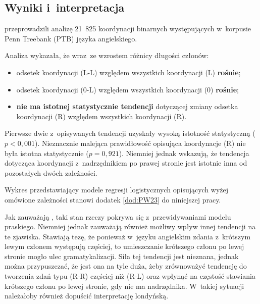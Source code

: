 





\subsection{Wyniki i~interpretacja}

\cite{przepiorkowski2023conjunct} przeprowadzili analizę 21~825 koordynacji binarnych występujących w~korpusie Penn Treebank (PTB) języka angielskiego.

Analiza wykazała, że wraz~ze wzrostem różnicy długości członów:
\begin{itemize}
\item odsetek koordynacji (L-L) względem wszystkich koordynacji (L) \textbf{rośnie};
\item odsetek koordynacji (0-L) względem wszystkich koordynacji (0) \textbf{rośnie};
\item \textbf{nie ma istotnej statystycznie tendencji} dotyczącej zmiany odsetka koordynacji (R) względem wszystkich koordynacji (R).
\end{itemize}

Pierwsze dwie z~opisywanych tendencji uzyskały wysoką istotność statystyczną ($p<0,001$). Nieznacznie malejąca prawidłowość opisująca koordynacje (R) nie była istotna statystycznie ($p = 0,921$). Niemniej jednak \cite{przepiorkowski2023conjunct} wskazują, że tendencja dotycząca koordynacji z~nadrzędnikiem po prawej stronie jest istotnie inna od pozostałych dwóch zależności. 

Wykres przedstawiający modele regresji logistycznych opisujących wyżej omówione zależności stanowi dodatek \ref{dod:PW23} do niniejszej pracy.

Jak zauważają \cite{przepiorkowski2023conjunct}, taki stan rzeczy pokrywa się z~przewidywaniami modelu praskiego. Niemniej jednak zauważają również możliwy wpływ innej tendencji na te zjawiska. Stawiają tezę, że ponieważ w~języku angielskim zdania z~krótszym lewym członem występują częściej, to umieszczanie krótszego członu po lewej stronie mogło ulec gramatykalizacji. Siła tej tendencji jest nieznana, jednak można przypuszczać, że jest ona na tyle duża, żeby zrównoważyć tendencję do tworzenia zdań typu (R-R) częściej niż (R-L) oraz wpłynąć na częstość stawiania krótszego członu po lewej stronie, gdy nie ma nadrzędnika. W~takiej sytuacji należałoby również dopuścić interpretację londyńską.

